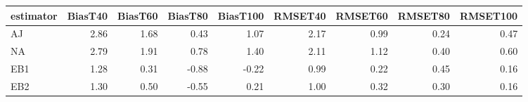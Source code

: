 \begin{table}[ht]
\centering
\begin{tabular}{lrrrrrrrr}
  \toprule
estimator & BiasT40 & BiasT60 & BiasT80 & BiasT100 & RMSET40 & RMSET60 & RMSET80 & RMSET100 \\ 
  \midrule
AJ & 2.86 & 1.68 & 0.43 & 1.07 & 2.17 & 0.99 & 0.24 & 0.47 \\ 
  NA & 2.79 & 1.91 & 0.78 & 1.40 & 2.11 & 1.12 & 0.40 & 0.60 \\ 
  EB1 & 1.28 & 0.31 & -0.88 & -0.22 & 0.99 & 0.22 & 0.45 & 0.16 \\ 
  EB2 & 1.30 & 0.50 & -0.55 & 0.21 & 1.00 & 0.32 & 0.30 & 0.16 \\ 
   \bottomrule
\end{tabular}
\end{table}
